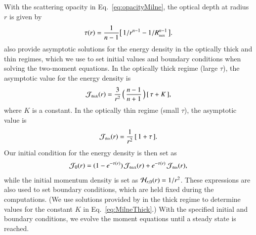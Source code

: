 \documentclass[11pt,letterpaper,twoside,english,final]{article}
\begin{document}
With the scattering opacity in Eq.~\eqref{eq:opacityMilne}, the optical depth at radius $r$ is given by
\begin{equation}
  \tau(r)=\frac{1}{n-1}\big[\,1/r^{n-1}-1/R_{\mbox{\tiny max}}^{n-1}\,\big].
\end{equation}
\citet{hummerRybicki_1971} also provide asymptotic solutions for the energy density in the optically thick and thin regimes, which we use to set initial values and boundary conditions when solving the two-moment equations.  
In the optically thick regime (large $\tau$), the asymptotic value for the energy density is
\begin{equation}
  \mathcal{J}_{\mbox{\tiny thick}}(r)
  =\frac{3}{r^{2}}\,\Big(\,\frac{n-1}{n+1}\,\Big)\,[\,\tau+K\,], 
  \label{eq:MilneThick}
\end{equation}
where $K$ is a constant.  
In the optically thin regime (small $\tau$), the asymptotic value is
\begin{equation}
  \mathcal{J}_{\mbox{\tiny thin}}(r)
  =\frac{1}{r^{2}}\,[\,1+\tau\,].  
\end{equation}
Our initial condition for the energy density is then set as
\begin{equation}
  \mathcal{J}_{0}(r)
  =(1-e^{-\tau(r)})\,\mathcal{J}_{\mbox{\tiny thick}}(r)+e^{-\tau(r)}\,\mathcal{J}_{\mbox{\tiny thin}}(r),
\end{equation}
while the initial momentum density is set as $\mathcal{H}_{r,0}(r)=1/r^{2}$.  
These expressions are also used to set boundary conditions, which are held fixed during the computations.  
(We use solutions provided by \citet{hummerRybicki_1971} in the thick regime to determine values for the constant $K$ in Eq.~\eqref{eq:MilneThick}.)
With the specified initial and boundary conditions, we evolve the moment equations until a steady state is reached.  
\end{document}
